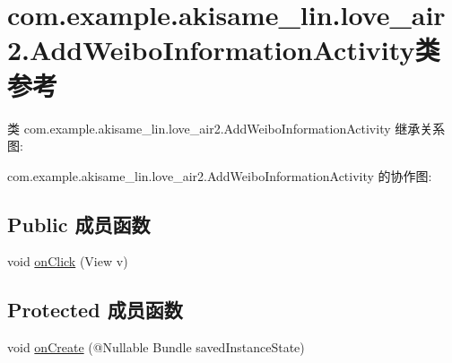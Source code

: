 \hypertarget{classcom_1_1example_1_1akisame__lin_1_1love__air2_1_1_add_weibo_information_activity}{}\section{com.\+example.\+akisame\+\_\+lin.\+love\+\_\+air2.\+Add\+Weibo\+Information\+Activity类 参考}
\label{classcom_1_1example_1_1akisame__lin_1_1love__air2_1_1_add_weibo_information_activity}


类 com.\+example.\+akisame\+\_\+lin.\+love\+\_\+air2.\+Add\+Weibo\+Information\+Activity 继承关系图\+:


com.\+example.\+akisame\+\_\+lin.\+love\+\_\+air2.\+Add\+Weibo\+Information\+Activity 的协作图\+:
\subsection*{Public 成员函数}
\begin{DoxyCompactItemize}
\item 
void \mbox{\hyperlink{classcom_1_1example_1_1akisame__lin_1_1love__air2_1_1_add_weibo_information_activity_a2bbf0bdcb52655d1ea91331411bff4b1}{on\+Click}} (View v)
\end{DoxyCompactItemize}
\subsection*{Protected 成员函数}
\begin{DoxyCompactItemize}
\item 
void \mbox{\hyperlink{classcom_1_1example_1_1akisame__lin_1_1love__air2_1_1_add_weibo_information_activity_a739bfebc8df4bcfa259014e2b50c50af}{on\+Create}} (@Nullable Bundle saved\+Instance\+State)
\end{DoxyCompactItemize}
